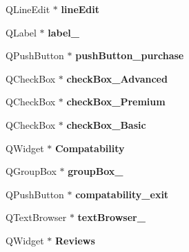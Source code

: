 \begin{DoxyCompactItemize}
\mbox{\label{class_ui___main_window_a7a5b9a4633d64f502ce81da3202d828c}} 
Q\+Line\+Edit $\ast$ {\bfseries line\+Edit}
\item 
\mbox{\label{class_ui___main_window_abc961131f050e928f4796986d8d1c24b}} 
Q\+Label $\ast$ {\bfseries label\+\_}
\item 
\mbox{\label{class_ui___main_window_a56ae9c241312886ffb1a80d6584db877}} 
Q\+Push\+Button $\ast$ {\bfseries push\+Button\+\_\+purchase}
\item 
\mbox{\label{class_ui___main_window_a3214f3361134ca4c51dc9953b774899c}} 
Q\+Check\+Box $\ast$ {\bfseries check\+Box\+\_\+\+Advanced}
\item 
\mbox{\label{class_ui___main_window_af64e0611bc6bcef159f8da1703e24429}} 
Q\+Check\+Box $\ast$ {\bfseries check\+Box\+\_\+\+Premium}
\item 
\mbox{\label{class_ui___main_window_afceb1ee440d5942398f61d177f933da5}} 
Q\+Check\+Box $\ast$ {\bfseries check\+Box\+\_\+\+Basic}
\item 
\mbox{\label{class_ui___main_window_a86a1a776d63d83ea8b1682314469d0cc}} 
Q\+Widget $\ast$ {\bfseries Compatability}
\item 
\mbox{\label{class_ui___main_window_a40a9931365fd3679efec4f0112073db2}} 
Q\+Group\+Box $\ast$ {\bfseries group\+Box\+\_}
\item 
\mbox{\label{class_ui___main_window_a42b62b4c61fbaa2e067af604dc86cafb}} 
Q\+Push\+Button $\ast$ {\bfseries compatability\+\_\+exit}
\item 
\mbox{\label{class_ui___main_window_a122d9e21c2d0dc6314020c8669008e8d}} 
Q\+Text\+Browser $\ast$ {\bfseries text\+Browser\+\_}
\item 
\mbox{\label{class_ui___main_window_a2de8c3a7d085c28623d884250eb6a379}} 
Q\+Widget $\ast$ {\bfseries Reviews}

\end{DoxyCompactItemize}
